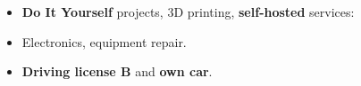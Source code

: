 \documentclass[10pt,a4paper,ragged2e,withhyper]{altacv}
\begin{document}
\begin{paracol}{2}

\begin{itemize}
  \setlength{\itemindent}{0.5em}
  \item \textbf{Do It Yourself} projects, 3D printing, \textbf{self-hosted} services:
    \\   
  \item Electronics, equipment repair.
  \item \textbf{Driving license B} and \textbf{own car}.
\end{itemize}











\end{paracol}
\end{document}
